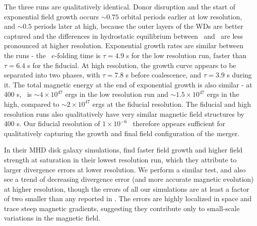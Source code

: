 The three runs are qualitatively identical.  Donor disruption and the start of exponential field growth occurs $\sim0.75$ orbital periods earlier at low resolution, and $\sim0.5$ periods later at high, because the outer layers of the WDs are better captured and the differences in hydrostatic equilibrium between \arepo\ and \gasoline\ are less pronounced at higher resolution.  Exponential growth rates are similar between the runs - the \EB\ $e$-folding time is $\tau = 4.9$ s for the low resolution run, faster than $\tau = 6.4$ s for the fiducial.  At high resolution, the growth curve appears to be separated into two phases, with $\tau = 7.8$ s before coalescence, and $\tau = 3.9$ s during it.  The total magnetic energy at the end of exponential growth is also similar - at 400 s, \EB\ is $\sim4\times10^{47}$ ergs in the low resolution run and $\sim1.5\times10^{47}$ ergs in the high, compared to $\sim2\times10^{47}$ ergs at the fiducial resolution.  The fiducial and high resolution runs also qualitatively have very similar magnetic field structures by 400 s.  Our fiducial resolution of $1\times10^{-6}$ \Msun\ therefore appears sufficient for qualitatively capturing the growth and final field configuration of the merger.

In their MHD disk galaxy simulations, \cite{pakms13} find faster field growth and higher field strength at saturation in their lowest resolution run, which they attribute to larger divergence errors at lower resolution.  We perform a similar test, and also see a trend of decreasing divergence error (and more accurate magnetic evolution) at higher resolution, though the errors of all our simulations are at least a factor of two smaller than any reported in \cite{pakms13}.  The errors are highly localized in space and trace steep magnetic gradients, suggesting they contribute only to small-scale variations in the magnetic field.


